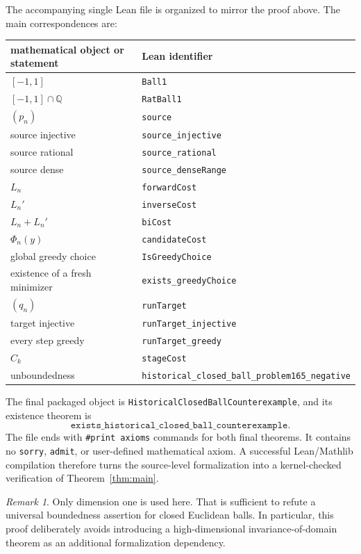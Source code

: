 \documentclass[11pt]{amsart}
\theoremstyle{definition}
\theoremstyle{remark}
\newtheorem{remark}[theorem]{Remark}
\newcommand{\Q}{\mathbb Q}
\begin{document}
The accompanying single Lean file is organized to mirror the proof above.  The main correspondences are:
\begin{center}
\small
\begin{tabular}{ll}
\hline
mathematical object or statement & Lean identifier\\
\hline
$[-1,1]$ & \texttt{Ball1}\\
$[-1,1]\cap\Q$ & \texttt{RatBall1}\\
$(p_n)$ & \texttt{source}\\
source injective & \texttt{source\_injective}\\
source rational & \texttt{source\_rational}\\
source dense & \texttt{source\_denseRange}\\
$L_n$ & \texttt{forwardCost}\\
$L_n'$ & \texttt{inverseCost}\\
$L_n+L_n'$ & \texttt{biCost}\\
$\Phi_n(y)$ & \texttt{candidateCost}\\
global greedy choice & \texttt{IsGreedyChoice}\\
existence of a fresh minimizer & \texttt{exists\_greedyChoice}\\
$(q_n)$ & \texttt{runTarget}\\
target injective & \texttt{runTarget\_injective}\\
every step greedy & \texttt{runTarget\_greedy}\\
$C_k$ & \texttt{stageCost}\\
unboundedness & \texttt{historical\_closed\_ball\_problem165\_negative}\\
\hline
\end{tabular}
\end{center}

The final packaged object is \texttt{HistoricalClosedBallCounterexample}, and its existence theorem is
\[
\texttt{exists\_historical\_closed\_ball\_counterexample}.
\]
The file ends with \texttt{\#print axioms} commands for both final theorems.  It contains no \texttt{sorry}, \texttt{admit}, or user-defined mathematical axiom.  A successful Lean/Mathlib compilation therefore turns the source-level formalization into a kernel-checked verification of Theorem~\ref{thm:main}.

\begin{remark}
Only dimension one is used here.  That is sufficient to refute a universal boundedness assertion for closed Euclidean balls.  In particular, this proof deliberately avoids introducing a high-dimensional invariance-of-domain theorem as an additional formalization dependency.
\end{remark}
\end{document}
